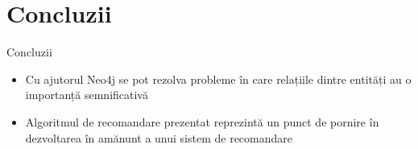 \documentclass{beamer}
\begin{document}
\section{Concluzii}
\frame{\tableofcontents[currentsection]}
\begin{frame}{Concluzii}
	\begin{itemize}
	    \item Cu ajutorul Neo4j se pot rezolva probleme în care relațiile dintre entități au o importanță semnificativă
	    \item Algoritmul de recomandare prezentat reprezintă un punct de pornire în dezvoltarea în amănunt a unui sistem de recomandare
	\end{itemize}
\end{frame}
\end{document}
